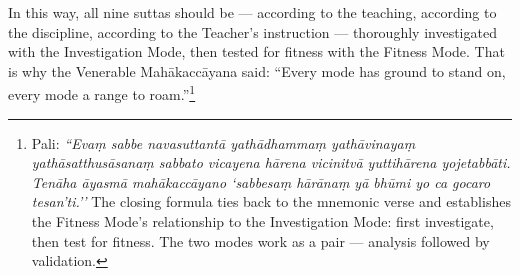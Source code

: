 \ornament

In this way, all nine suttas should be --- according to the teaching, according to the discipline, according to the Teacher's instruction --- thoroughly investigated with the Investigation Mode, then tested for fitness with the Fitness Mode. That is why the Venerable Mahākaccāyana said: ``Every mode has ground to stand on, every mode a range to roam.''\footnote{Pali: \textit{``Evaṃ sabbe navasuttantā yathādhammaṃ yathāvinayaṃ yathāsatthusāsanaṃ sabbato vicayena hārena vicinitvā yuttihārena yojetabbāti. Tenāha āyasmā mahākaccāyano `sabbesaṃ hārānaṃ yā bhūmi yo ca gocaro tesan'ti.''} The closing formula ties back to the mnemonic verse and establishes the Fitness Mode's relationship to the Investigation Mode: first investigate, then test for fitness. The two modes work as a pair --- analysis followed by validation.}
